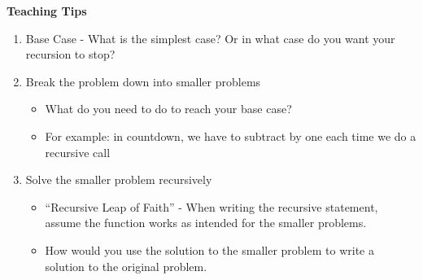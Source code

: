 \begin{blocksection}
\begin{guide}
\textbf{Teaching Tips}
\begin{enumerate}
	    \item Base Case - What is the simplest case? Or in what case do you want your recursion to stop?
	    \item Break the problem down into smaller problems
	    \begin{itemize}
			\item What do you need to do to reach your base case? 
			\item For example: in countdown, we have to subtract by one each time we do a recursive call
		\end{itemize}
		\item Solve the smaller problem recursively
		\begin{itemize}
			\item “Recursive Leap of Faith” - When writing the recursive statement, assume the function works as intended for the smaller problems.
			\item How would you use the solution to the smaller problem to write a solution to the original problem.
		\end{itemize}
\end{enumerate}
\end{guide}
\end{blocksection}